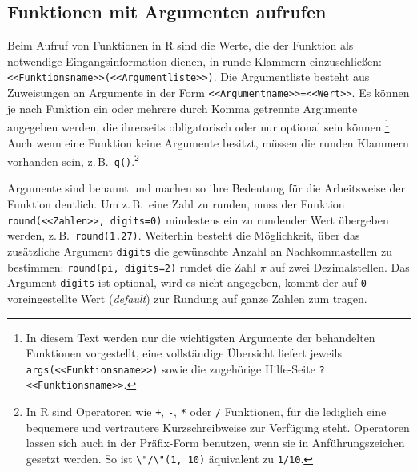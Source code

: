 \subsection{Funktionen mit Argumenten aufrufen}
\label{sec:funcParam}

Beim Aufruf von Funktionen in R sind die Werte, die der Funktion als notwendige Eingangsinformation dienen, in runde Klammern einzuschließen: \lstinline!<<Funktionsname>>(<<Argumentliste>>)!. Die Argumentliste besteht aus Zuweisungen an Argumente in der Form \lstinline!<<Argumentname>>=<<Wert>>!. Es können je nach Funktion ein oder mehrere durch Komma getrennte Argumente angegeben werden, die ihrerseits obligatorisch oder nur optional sein können.\footnote{In diesem Text werden nur die wichtigsten Argumente der behandelten Funktionen vorgestellt, eine vollständige Übersicht liefert jeweils \lstinline!args(<<Funktionsname>>)! sowie die zugehörige Hilfe-Seite \lstinline!?<<Funktionsname>>!.} Auch wenn eine Funktion keine Argumente besitzt, müssen die runden Klammern vorhanden sein, z.\,B.\ \lstinline!q()!.\footnote{\label{ftn:functional}In R sind Operatoren wie \lstinline!+!, \lstinline!-!, \lstinline!*! oder \lstinline!/! Funktionen, für die lediglich eine bequemere und vertrautere Kurzschreibweise zur Verfügung steht. Operatoren lassen sich auch in der Präfix-Form benutzen, wenn sie in Anführungszeichen gesetzt werden. So ist \lstinline!\"/\"(1, 10)! äquivalent zu \lstinline!1/10!.}

Argumente sind benannt und machen so ihre Bedeutung für die Arbeitsweise der Funktion deutlich. Um z.\,B.\ eine Zahl zu runden, muss der Funktion \lstinline!round(<<Zahlen>>, digits=0)! mindestens ein zu rundender Wert übergeben werden, z.\,B.\ \lstinline!round(1.27)!. Weiterhin besteht die Möglichkeit, über das zusätzliche Argument \lstinline!digits! die gewünschte Anzahl an Nachkommastellen zu bestimmen: \lstinline!round(pi, digits=2)! rundet die Zahl $\pi$ auf zwei Dezimalstellen. Das Argument \lstinline!digits! ist optional, wird es nicht angegeben, kommt der auf \lstinline!0! voreingestellte Wert (\emph{default}) zur Rundung auf ganze Zahlen zum tragen.

